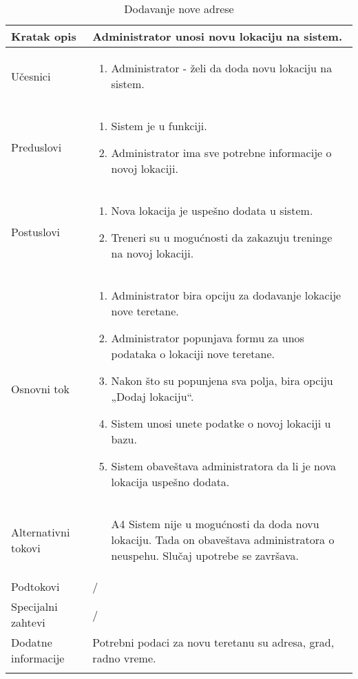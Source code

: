 \documentclass[../main.tex]{subfiles}
\begin{document}
\begin{longtable}{| p{} | p{} |} 

\hline
    Kratak opis &  Administrator unosi novu lokaciju na sistem.\\ 
\hline    
    Učesnici & 
    	\begin{enumerate}
        \item Administrator - želi da doda novu lokaciju na sistem.
     \end{enumerate}\\
\hline
   Preduslovi & \begin{enumerate}
       \item Sistem je u funkciji.
       \item Administrator ima sve potrebne informacije o novoj lokaciji.
   \end{enumerate}\\
\hline  
    Postuslovi & \begin{enumerate}
        \item Nova lokacija je uspešno dodata u sistem.
        \item Treneri su u mogućnosti da zakazuju treninge na novoj lokaciji.
    \end{enumerate}\\
\hline
    Osnovni tok & \begin{enumerate}
        \item Administrator bira opciju za dodavanje lokacije nove teretane.
        \item Administrator popunjava formu za unos podataka o lokaciji nove teretane.
        \item Nakon što su popunjena sva polja, bira opciju „Dodaj lokaciju“.
        \item Sistem unosi unete podatke o novoj lokaciji u bazu.
        \item Sistem obaveštava administratora da li je nova lokacija uspešno dodata.
    \end{enumerate}\\
\hline
    Alternativni tokovi & \begin{itemize}
        \item[A4]  Sistem nije u mogućnosti da doda novu lokaciju. Tada on obaveštava administratora o neuspehu. Slučaj upotrebe se završava.

    \end{itemize}\\
\hline
    Podtokovi & /\\
\hline
    Specijalni zahtevi & /\\
\hline
    Dodatne informacije & Potrebni podaci za novu teretanu su adresa, grad, radno vreme.\\
\hline
\caption{Dodavanje nove adrese} %
\end{longtable}
\end{document}

